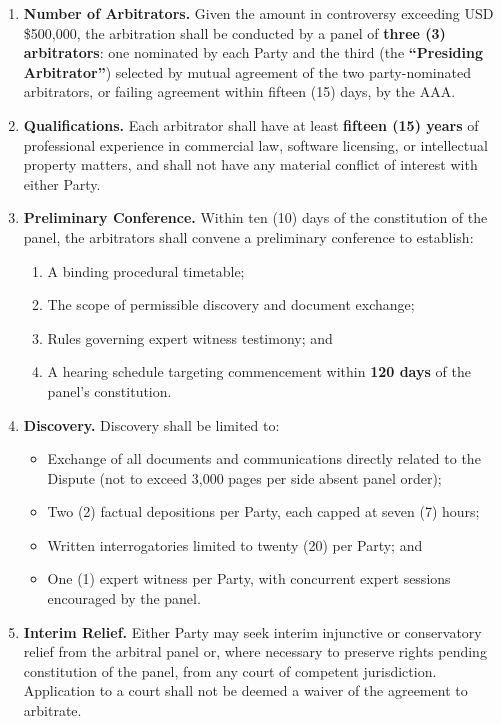 \documentclass[11pt,a4paper]{article}
\begin{document}
\begin{enumerate}
  \item \textbf{Number of Arbitrators.} Given the amount in controversy
    exceeding USD\,\$500,000, the arbitration shall be conducted by a panel of
    \textbf{three (3) arbitrators}: one nominated by each Party and the third
    (the \textbf{``Presiding Arbitrator''}) selected by mutual agreement of the
    two party-nominated arbitrators, or failing agreement within fifteen (15)
    days, by the AAA.

  \item \textbf{Qualifications.} Each arbitrator shall have at least
    \textbf{fifteen (15) years} of professional experience in commercial law,
    software licensing, or intellectual property matters, and shall not have any
    material conflict of interest with either Party.

  \item \textbf{Preliminary Conference.} Within ten (10) days of the
    constitution of the panel, the arbitrators shall convene a preliminary
    conference to establish:
    \begin{enumerate}
      \item A binding procedural timetable;
      \item The scope of permissible discovery and document exchange;
      \item Rules governing expert witness testimony; and
      \item A hearing schedule targeting commencement within \textbf{120 days}
        of the panel's constitution.
    \end{enumerate}

  \item \textbf{Discovery.} Discovery shall be limited to:
    \begin{itemize}
      \item Exchange of all documents and communications directly related to the
        Dispute (not to exceed 3,000 pages per side absent panel order);
      \item Two (2) factual depositions per Party, each capped at seven (7)
        hours;
      \item Written interrogatories limited to twenty (20) per Party; and
      \item One (1) expert witness per Party, with concurrent expert sessions
        encouraged by the panel.
    \end{itemize}

  \item \textbf{Interim Relief.} Either Party may seek interim injunctive or
    conservatory relief from the arbitral panel or, where necessary to preserve
    rights pending constitution of the panel, from any court of competent
    jurisdiction. Application to a court shall not be deemed a waiver of the
    agreement to arbitrate.
\end{enumerate}
\end{document}
